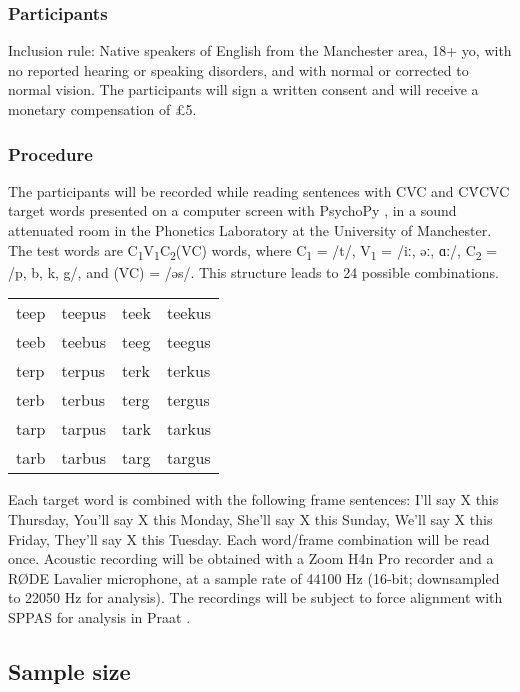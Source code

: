 \documentclass[11pt,]{article}
\begin{document}
\subsubsection{Participants}\label{participants}

Inclusion rule: Native speakers of English from the Manchester area, 18+
yo, with no reported hearing or speaking disorders, and with normal or
corrected to normal vision. The participants will sign a written consent
and will receive a monetary compensation of £5.

\subsubsection{Procedure}\label{procedure}

\label{s:procedure}

The participants will be recorded while reading sentences with CVC and
CV́CVC target words presented on a computer screen with PsychoPy
\citep{peirce2009}, in a sound attenuated room in the Phonetics
Laboratory at the University of Manchester. The test words are
C\textsubscript{1}V\textsubscript{1}C\textsubscript{2}(VC) words, where
C\textsubscript{1} = /t/, V\textsubscript{1} = /iː, əː, ɑː/,
C\textsubscript{2} = /p, b, k, g/, and (VC) = /əs/. This structure leads
to 24 possible combinations.

\begin{tabular}{llll}
teep & teepus & teek & teekus \\
teeb & teebus & teeg & teegus \\
terp & terpus & terk & terkus \\
terb & terbus & terg & tergus \\
tarp & tarpus & tark & tarkus \\
tarb & tarbus & targ & targus \\
\end{tabular}

Each target word is combined with the following frame sentences: I'll
say X this Thursday, You'll say X this Monday, She'll say X this Sunday,
We'll say X this Friday, They'll say X this Tuesday. Each word/frame
combination will be read once. Acoustic recording will be obtained with
a Zoom H4n Pro recorder and a RØDE Lavalier microphone, at a sample rate
of 44100 Hz (16-bit; downsampled to 22050 Hz for analysis). The
recordings will be subject to force alignment with SPPAS
\citep{bigi2015} for analysis in Praat \citep{boersma2018}.

\subsection{Sample size}\label{sample-size}
\end{document}
